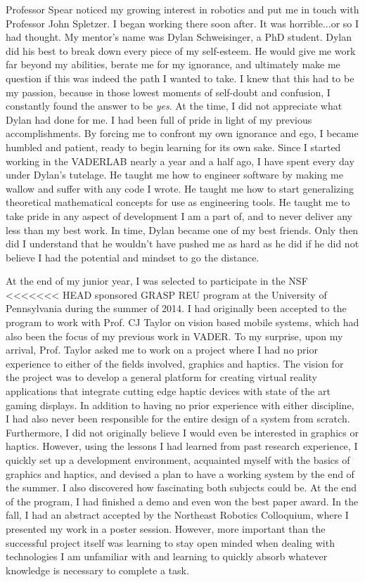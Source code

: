 \documentclass[10pt]{article}
\begin{document}
Professor Spear noticed my growing interest in robotics and put me in touch
with Professor John Spletzer. I began working there soon after. It was
horrible...or so I had thought. My mentor's name was Dylan Schweisinger, a PhD
student. Dylan did his best to break down every piece of my self-esteem. He
would give me work far beyond my abilities, berate me for my ignorance, and
ultimately make me question if this was indeed the path I wanted to take. I
knew that this had to be my passion, because in those lowest moments of
self-doubt and confusion, I constantly found the answer to be \emph{yes}. At
the time, I did not appreciate what Dylan had done for me. I had been full of
pride in light of my previous accomplishments. By forcing me to confront my own
ignorance and ego, I became humbled and patient, ready to begin learning for
its own sake. Since I started working in the VADERLAB nearly a year and a half
ago, I have spent every day under Dylan's tutelage.  He taught me how to
engineer software by making me wallow and suffer with any code I wrote. He
taught me how to start generalizing theoretical mathematical concepts for use
as engineering tools. He taught me to take pride in any aspect of development I
am a part of, and to never deliver any less than my best work. In time, Dylan
became one of my best friends. Only then did I understand that he wouldn't have
pushed me as hard as he did if he did not believe I had the potential and
mindset to go the distance.

At the end of my junior year, I was selected to participate in the NSF
<<<<<<< HEAD
sponsored GRASP REU program at the University of Pennsylvania during the summer
of 2014. I had originally been accepted to the program to work with Prof. CJ
Taylor on vision based mobile systems, which had also been the focus of my
previous work in VADER. To my surprise, upon my arrival, Prof. Taylor asked me
to work on a project where I had no prior experience to either of the fields
involved, graphics and haptics. The vision for the project was to develop a
general platform for creating virtual reality applications that integrate
cutting edge haptic devices with state of the art gaming displays. In addition
to having no prior experience with either discipline, I had also never been
responsible for the entire design of a system from scratch. Furthermore, I did
not originally believe I would even be interested in graphics or haptics.
However, using the lessons I had learned from past research experience, I
quickly set up a development environment, acquainted myself with the basics of
graphics and haptics, and devised a plan to have a working system by the end of
the summer. I also discovered how fascinating both subjects could be. At the
end of the program, I had finished a demo and even won the best paper award. In
the fall, I had an abstract accepted by the Northeast Robotics Colloquium,
where I presented my work in a poster session. However, more important than 
the successful project itself was learning to stay open minded when dealing
with technologies I am unfamiliar with and learning to quickly absorb whatever
knowledge is necessary to complete a task.
\end{document}
